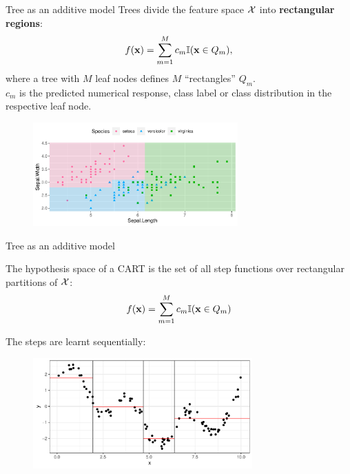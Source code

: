 \documentclass[11pt,compress,t,notes=noshow, xcolor=table]{beamer}
\begin{document}
\begin{vbframe}{Tree as an additive model}
Trees divide the feature space $\mathcal{X}$ into \textbf{rectangular regions}: 
  \begin{align*}
    f(\mathbf{x}) = \sum_{m=1}^M c_m \mathbb{I}(\mathbf{x} \in Q_m),
  \end{align*}
  where a tree with $M$ leaf nodes defines $M$ \enquote{rectangles} $Q_m$.\\
  $c_m$ is the predicted numerical response, class label or class
  distribution in the respective leaf node.
  \begin{figure}
\includegraphics[width=0.7\textwidth, keepaspectratio]{figure/cart_intro_classification_tree_wide.pdf}
\end{figure}

\end{vbframe}



\begin{vbframe}{Tree as an additive model}

The hypothesis space of a CART is the set of all step functions over rectangular partitions of $\mathcal{X}$:
\begin{align*}
    f(\mathbf{x}) = \sum_{m=1}^M c_m \mathbb{I}(\mathbf{x} \in Q_m)
\end{align*}

The steps are learnt sequentially:

\begin{figure} 
\includegraphics[width=0.75\textwidth, keepaspectratio]{figure/cart_intro_regression_tree_wide.pdf}
\end{figure}

\end{vbframe}
\end{document}
